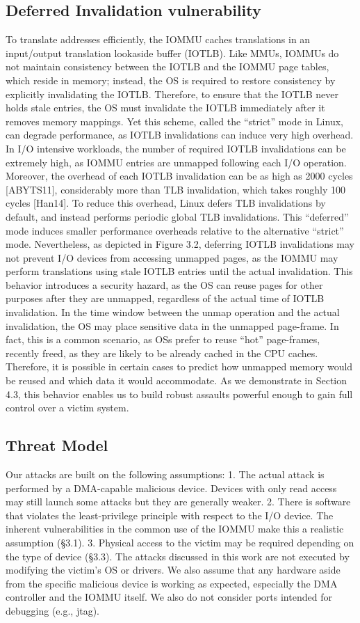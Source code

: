 \subsection{Deferred Invalidation vulnerability}
To translate addresses efficiently, the IOMMU caches translations in an input/output
translation lookaside buffer (IOTLB). Like MMUs, IOMMUs do not maintain consistency
between the IOTLB and the IOMMU page tables, which reside in memory; instead, the
OS is required to restore consistency by explicitly invalidating the IOTLB. Therefore,
to ensure that the IOTLB never holds stale entries, the OS must invalidate the IOTLB
immediately after it removes memory mappings.
Yet this scheme, called the “strict” mode in Linux, can degrade performance, as
IOTLB invalidations can induce very high overhead. In I/O intensive workloads, the
number of required IOTLB invalidations can be extremely high, as IOMMU entries
are unmapped following each I/O operation. Moreover, the overhead of each IOTLB invalidation can be as high as 2000 cycles [ABYTS11], considerably more than TLB
invalidation, which takes roughly 100 cycles [Han14].
To reduce this overhead, Linux defers TLB invalidations by default, and instead
performs periodic global TLB invalidations. This “deferred” mode induces smaller
performance overheads relative to the alternative “strict” mode. Nevertheless, as
depicted in Figure 3.2, deferring IOTLB invalidations may not prevent I/O devices
from accessing unmapped pages, as the IOMMU may perform translations using stale
IOTLB entries until the actual invalidation.
This behavior introduces a security hazard, as the OS can reuse pages for other
purposes after they are unmapped, regardless of the actual time of IOTLB invalidation.
In the time window between the unmap operation and the actual invalidation, the
OS may place sensitive data in the unmapped page-frame. In fact, this is a common
scenario, as OSs prefer to reuse “hot” page-frames, recently freed, as they are likely to
be already cached in the CPU caches. Therefore, it is possible in certain cases to predict
how unmapped memory would be reused and which data it would accommodate. As we
demonstrate in Section 4.3, this behavior enables us to build robust assaults powerful
enough to gain full control over a victim system.
\subsection{Threat Model}
Our attacks are built on the following assumptions:
1. The actual attack is performed by a DMA-capable malicious device. Devices with
only read access may still launch some attacks but they are generally weaker.
2. There is software that violates the least-privilege principle with respect to the I/O
device. The inherent vulnerabilities in the common use of the IOMMU make this
a realistic assumption (§3.1).
3. Physical access to the victim may be required depending on the type of device (§3.3).
The attacks discussed in this work are not executed by modifying the victim’s OS or
drivers. We also assume that any hardware aside from the specific malicious device is
working as expected, especially the DMA controller and the IOMMU itself. We also do
not consider ports intended for debugging (e.g., jtag).

